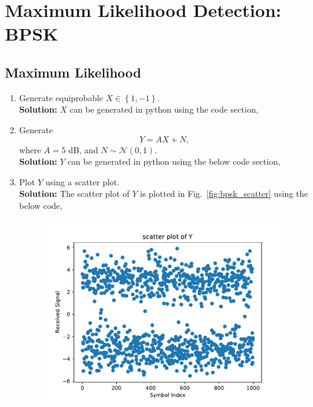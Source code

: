 \documentclass[12pt]{book}
\newcommand\figref{Fig.~\ref}
\providecommand{\cbrak}[1]{\ensuremath{\left\{#1\right\}}}
\newcommand{\solution}{\noindent \textbf{Solution: }}
\providecommand{\gauss}[2]{\mathcal{N}\ensuremath{\left(#1,#2\right)}}
\begin{document}
\chapter{Maximum Likelihood Detection: BPSK}
\section{Maximum Likelihood}
\begin{enumerate}
\item Generate equiprobable $X \in \cbrak{1,-1}$.\\
\solution $X$ can be generated in python using the  code section,
\begin{center}
\end{center}
\item Generate 
\begin{equation}
Y = AX+N,
\end{equation}
		where $A = 5$ dB,  and $N \sim \gauss{0}{1}$.\\
\solution $Y$ can be generated in python using the below code section,
\begin{center}
\end{center}
\item Plot $Y$ using a scatter plot.\\
\solution The scatter plot of $Y$ is plotted in \figref{fig:bpsk_scatter} using the below code,
\begin{center}
\end{center}
\begin{figure}[H]
\centering
\includegraphics[width=\columnwidth]{./figs/3/3.1.3.pdf}

\end{figure}
\end{enumerate}
\end{document}
